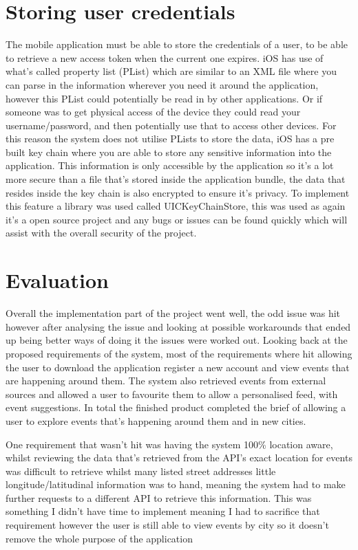 	\section{Storing user credentials}
		The mobile application must be able to store the credentials of a user, to be able to retrieve a new access token when the current one expires. iOS has use of what's called property list (PList) which are similar to an XML file where you can parse in the information wherever you need it around the application, however this PList could potentially be read in by other applications. Or if someone was to get physical access of the device they could read your username/password, and then potentially use that to access other devices. For this reason the system does not utilise PLists to store the data, iOS has a pre built key chain where you are able to store any sensitive information into the application. This information is only accessible by the application so it's a lot more secure than a file that's stored inside the application bundle, the data that resides inside the key chain is also encrypted to ensure it's privacy. To implement this feature a library was used called UICKeyChainStore\cite{keychain}, this was used as again it's a open source project and any bugs or issues can be found quickly which will assist with the overall security of the project.

	\section{Evaluation}
		Overall the implementation part of the project went well, the odd issue was hit however after analysing the issue and looking at possible workarounds that ended up being better ways of doing it the issues were worked out. Looking back at the proposed requirements of the system, most of the requirements where hit allowing the user to download the application register a new account and view events that are happening around them. The system also retrieved events from external sources and allowed a user to favourite them to allow a personalised feed, with event suggestions. In total the finished product completed the brief of allowing a user to explore events that's happening around them and in new cities.

		One requirement that wasn't hit was having the system 100\% location aware, whilst reviewing the data that's retrieved from the API's exact location for events was difficult to retrieve whilst many listed street addresses little longitude/latitudinal information was to hand, meaning the system had to make further requests to a different API to retrieve this information. This was something I didn't have time to implement meaning I had to sacrifice that requirement however the user is still able to view events by city so it doesn't remove the whole purpose of the application